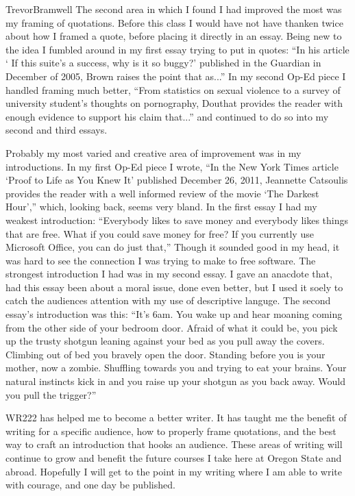 \documentclass[12pt,letterpaper]{article}
\begin{document}
\begin{mla}{Trevor}{Bramwell}
The second area in which I found I had improved the most was my framing of
quotations. Before this class I would have not have thanken twice about how
I framed a quote, before placing it directly in an essay. Being new to the idea
I fumbled around in my first essay trying to put in quotes: ``In his article `
If this suite's a success, why is it so buggy?' 
published in the Guardian in December of 2005, Brown raises the point that 
as...'' In my second Op-Ed piece I handled framing much better, ``From 
statistics on sexual violence to a survey of university student’s 
thoughts on pornography, Douthat provides the reader
with enough evidence to support his claim that...'' and continued to do so into
my second and third essays.

Probably my most varied and creative area of improvement was in my 
introductions. In my first Op-Ed piece I wrote, ``In the New York Times 
article `Proof to Life as You Knew It' published 
December 26, 2011, Jeannette Catsoulis provides the reader with a well informed
review of the movie `The Darkest Hour','' which, looking back, seems very 
bland. In the first essay I had my weakest introduction: ``Everybody likes to 
save money and everybody likes things that are 
free. What if you could save money for free? If you currently use Microsoft 
Office, you can do just that,'' Though it sounded good in my head, it
was hard to see the connection I was trying to make to free software. The
strongest introduction I had was in my second essay. I gave an
anacdote that, had this essay been about a moral issue, done even better, but
I used it soely to catch the audiences attention with my use of descriptive 
languge. The second essay's introduction was this: ``It’s 6am. You wake up and 
hear moaning coming from the other side of 
your bedroom door. Afraid of what it could be, you pick up the trusty shotgun 
leaning against your bed as you pull away the covers. Climbing out of bed you 
bravely open the door. Standing before you is your mother, now a zombie. 
Shuffling towards you and trying to eat your brains. Your natural instincts
kick in and you raise up your shotgun as you back away. Would you pull the 
trigger?''

WR222 has helped me to become a better writer. It has taught me the benefit of
writing for a specific audience, how to properly frame quotations, and the best
way to craft an introduction that hooks an audience. These areas of writing
will continue to grow and benefit the future courses I take here at Oregon
State and abroad. Hopefully I will get to the point in my writing where I am
able to write with courage, and one day be published.
\end{mla}
\end{document}
